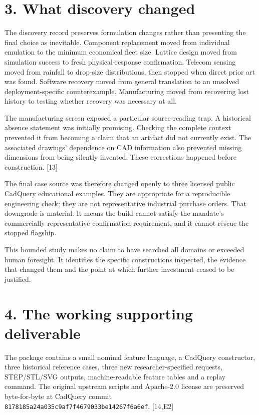 \documentclass[11pt,letterpaper]{article}
\begin{document}
\hypertarget{what-discovery-changed}{%
\section{3. What discovery changed}\label{what-discovery-changed}}

The discovery record preserves formulation changes rather than presenting the final choice as inevitable. Component replacement moved from individual emulation to the minimum economical fleet size. Lattice design moved from simulation success to fresh physical-response confirmation. Telecom sensing moved from rainfall to drop-size distributions, then stopped when direct prior art was found. Software recovery moved from general translation to an unsolved deployment-specific counterexample. Manufacturing moved from recovering lost history to testing whether recovery was necessary at all.

The manufacturing screen exposed a particular source-reading trap. A historical absence statement was initially promising. Checking the complete context prevented it from becoming a claim that an artifact did not currently exist. The associated drawings' dependence on CAD information also prevented missing dimensions from being silently invented. These corrections happened before construction. {[}13{]}

The final case source was therefore changed openly to three licensed public CadQuery educational examples. They are appropriate for a reproducible engineering check; they are not representative industrial purchase orders. That downgrade is material. It means the build cannot satisfy the mandate's commercially representative confirmation requirement, and it cannot rescue the stopped flagship.

This bounded study makes no claim to have searched all domains or exceeded human foresight. It identifies the specific constructions inspected, the evidence that changed them and the point at which further investment ceased to be justified.

\hypertarget{the-working-supporting-deliverable}{%
\section{4. The working supporting deliverable}\label{the-working-supporting-deliverable}}

The package contains a small nominal feature language, a CadQuery constructor, three historical reference cases, three new researcher-specified requests, STEP/STL/SVG outputs, machine-readable feature tables and a replay command. The original upstream scripts and Apache-2.0 license are preserved byte-for-byte at CadQuery commit \nolinkurl{8178185a24a035c9af7f4679033be14267f6a6ef}. {[}14,E2{]}
\end{document}
